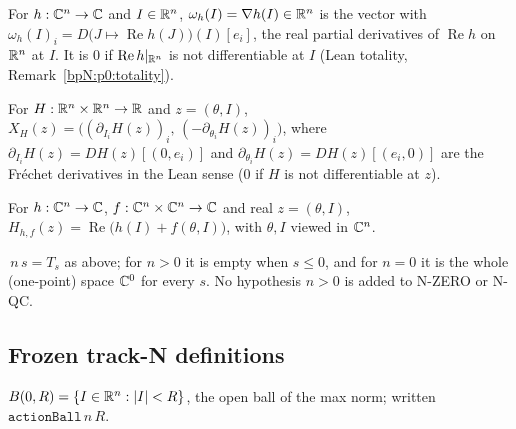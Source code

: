 \begin{definition}\label{bpN:p0:freq}
For $h:\mathbb{C}^n\to\mathbb{C}$ and $I\in\mathbb{R}^n$, $\omega_h(I)=\nabla h(I)\in\mathbb{R}^n$ is the vector with
$\omega_h(I)_i=D\bigl(J\mapsto\operatorname{Re}h(J)\bigr)(I)[e_i]$, the real partial derivatives of
$\operatorname{Re}h$ on $\mathbb{R}^n$ at $I$. It is $0$ if $\operatorname{Re}h|_{\mathbb{R}^n}$ is not differentiable at $I$
(Lean totality, Remark~\ref{bpN:p0:totality}).
\end{definition}

\begin{definition}\label{bpN:p0:vf}
For $H:\mathbb{R}^n\times\mathbb{R}^n\to\mathbb{R}$ and $z=(\theta,I)$, $X_H(z)=\bigl((\partial_{I_i}H(z))_i,\,(-\partial_{\theta_i}H(z))_i\bigr)$,
where $\partial_{I_i}H(z)=DH(z)[(0,e_i)]$ and $\partial_{\theta_i}H(z)=DH(z)[(e_i,0)]$ are the Fr\'echet
derivatives in the Lean sense ($0$ if $H$ is not differentiable at $z$).
\end{definition}

\begin{definition}\label{bpN:p0:realH}
For $h:\mathbb{C}^n\to\mathbb{C}$, $f:\mathbb{C}^n\times\mathbb{C}^n\to\mathbb{C}$ and real $z=(\theta,I)$,
$H_{h,f}(z)=\operatorname{Re}\bigl(h(I)+f(\theta,I)\bigr)$, with $\theta,I$ viewed in $\mathbb{C}^n$.
\end{definition}

\begin{remark}\label{bpN:p0:strip}
\,$n\,s=T_s$ as above; for $n>0$ it is empty when $s\le0$, and for $n=0$ it is the
whole (one-point) space $\mathbb{C}^0$ for every $s$. No hypothesis $n>0$ is added to N-ZERO or N-QC.
\end{remark}

\subsection{Frozen track-N definitions}\label{bpN:p0:defs}

\begin{definition}\label{bpN:p0:ball}
$B(0,R)=\{I\in\mathbb{R}^n:\lvert I\rvert<R\}$, the open ball of the max norm; written $\texttt{actionBall}\,n\,R$.
\end{definition}

